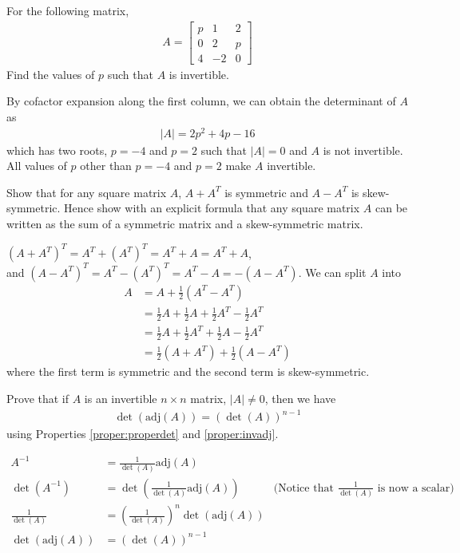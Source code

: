 \begin{Exercise}
For the following matrix,
\begin{align*}
A = 
\begin{bmatrix}
p & 1 & 2\\
0 & 2 & p\\
4 & -2 & 0
\end{bmatrix} 
\end{align*}
Find the values of $p$ such that $A$ is invertible.
\end{Exercise}
\begin{Answer}
By cofactor expansion along the first column, we can obtain the determinant of $A$ as
\begin{align*}
|A| = 2p^2 + 4p - 16
\end{align*}
which has two roots, $p = -4$ and $p = 2$ such that $|A| = 0$ and $A$ is not invertible. All values of $p$ other than $p = -4$ and $p = 2$ make $A$ invertible.
\end{Answer}

\begin{Exercise}
Show that for any square matrix $A$, $A + A^T$ is symmetric and $A - A^T$ is skew-symmetric. Hence show with an explicit formula that any square matrix $A$ can be written as the sum of a symmetric matrix and a skew-symmetric matrix.
\end{Exercise}
\begin{Answer}
$(A + A^T)^T = A^T + (A^T)^T = A^T+A = A^T+A$,\\
and $(A - A^T)^T = A^T - (A^T)^T = A^T-A = -(A - A^T)$. We can split $A$ into
\begin{align*}
A &= A + \frac{1}{2}(A^T - A^T) \\
&= \frac{1}{2}A + \frac{1}{2}A + \frac{1}{2}A^T - \frac{1}{2}A^T \\
&= \frac{1}{2}A + \frac{1}{2}A^T + \frac{1}{2}A - \frac{1}{2}A^T \\
&= \frac{1}{2}(A + A^T) + \frac{1}{2}(A - A^T)
\end{align*}
where the first term is symmetric and the second term is skew-symmetric.
\end{Answer}

\begin{Exercise}
Prove that if $A$ is an invertible $n \times n$ matrix, $|A| \neq 0$, then we have
\begin{align*}
\det(\text{adj}(A))=(\det(A))^{n-1}    
\end{align*}
using Properties \ref{proper:properdet} and \ref{proper:invadj}.
\end{Exercise}
\begin{Answer}
\begin{align*}
A^{-1} &= \frac{1}{\det(A)}\text{adj}(A) \\
\det(A^{-1}) &= \det(\frac{1}{\det(A)}\text{adj}(A)) & \text{(Notice that $\frac{1}{\det(A)}$ is now a scalar)}\\
\frac{1}{\det(A)} &= (\frac{1}{\det(A)})^n\det(\text{adj}(A)) \\
\det(\text{adj}(A)) &= (\det(A))^{n-1}  
\end{align*}
\end{Answer}